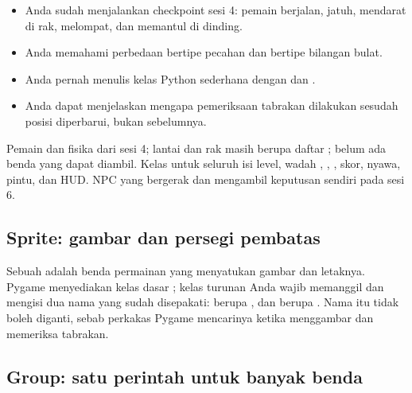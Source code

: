 
\begin{prasyaratbox}
\begin{itemize}[leftmargin=1.4em, itemsep=0.25em]
  \item Anda sudah menjalankan checkpoint sesi 4: pemain berjalan, jatuh,
        mendarat di rak, melompat, dan memantul di dinding.
  \item Anda memahami perbedaan  bertipe pecahan dan
         bertipe bilangan bulat.
  \item Anda pernah menulis kelas Python sederhana dengan  dan
        .
  \item Anda dapat menjelaskan mengapa pemeriksaan tabrakan dilakukan sesudah
        posisi diperbarui, bukan sebelumnya.
\end{itemize}
\end{prasyaratbox}


\petasesi
  {Pemain dan fisika dari sesi 4; lantai dan rak masih berupa daftar
   ; belum ada benda yang dapat diambil.}
  {Kelas  untuk seluruh isi level, wadah ,
   , , skor, nyawa, pintu, dan HUD.}
  {NPC yang bergerak dan mengambil keputusan sendiri pada sesi 6.}


\subsection*{Sprite: gambar dan persegi pembatas}

Sebuah  adalah benda permainan yang menyatukan gambar dan
letaknya. Pygame menyediakan kelas dasar ; kelas
turunan Anda wajib memanggil  dan mengisi dua nama
yang sudah disepakati:  berupa , dan
 berupa . Nama itu tidak boleh diganti, sebab
perkakas Pygame mencarinya ketika menggambar dan memeriksa tabrakan.

\subsection*{Group: satu perintah untuk banyak benda}

